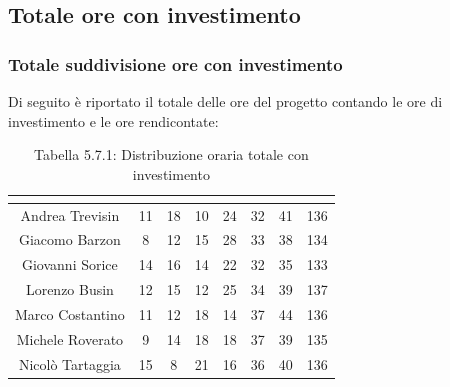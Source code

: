 \subsection{Totale ore con investimento}

\subsubsection{Totale suddivisione ore con investimento}
Di seguito è riportato il totale delle ore del progetto contando le ore di investimento e le ore rendicontate:

\renewcommand{\arraystretch}{1.5}
\begin{table}[H]
\begin{center}
\begin{tabular}{|c|c|c|c|c|c|c|c|}
\hline
\rowcolor{title_row}
\textbf{\color{title_text}{Nome}} & \textbf{\color{title_text}{Resp.}} & \textbf{\color{title_text}{Ammi.}} & \textbf{\color{title_text}{Analist.}} & \textbf{\color{title_text}{Progett.}} & \textbf{\color{title_text}{Program.}} & \textbf{\color{title_text}{Verific.}} & \textbf{\color{title_text}{Totale}} \\ \hline
Andrea Trevisin  & 11 & 18 & 10 & 24 & 32 & 41 & 136 \\ \hline
Giacomo Barzon   & 8 & 12 & 15 & 28 & 33 & 38 & 134 \\ \hline
Giovanni Sorice  & 14 & 16 & 14 & 22 & 32 & 35 & 133 \\ \hline
Lorenzo Busin    & 12 & 15 & 12 & 25 & 34 & 39 & 137 \\ \hline
Marco Costantino & 11 & 12 & 18 & 14 & 37 & 44 & 136 \\ \hline
Michele Roverato & 9 & 14 & 18 & 18 & 37 & 39 & 135 \\ \hline
Nicolò Tartaggia & 15 & 8 & 21 & 16 & 36 & 40 & 136  \\ \hline
\end{tabular}
\caption{Tabella 5.7.1: Distribuzione oraria totale con investimento\label{}}
\end{center}
\end{table}
\renewcommand{\arraystretch}{1}

